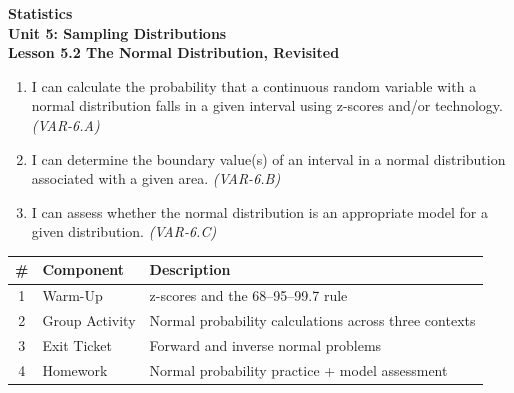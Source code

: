 \documentclass[10pt]{article}
\begin{document}
\vspace{-0.8in}

\begin{center}
  {\color{white}\textbf{\LARGE Statistics}}\\[4pt]
  {\color{skymid}\large\textbf{Unit 5: Sampling Distributions}}\\[6pt]
  {\color{white}\textbf{\large Lesson 5.2 \quad The Normal Distribution, Revisited}}
\end{center}

\vspace{0.22in}
\namedateperiod
\vspace{0.18in}

\begin{learningtargetbox}
\small
\begin{enumerate}[leftmargin=1.5em, itemsep=5pt]
  \item I can calculate the probability that a continuous random variable with a normal
        distribution falls in a given interval using z-scores and/or technology.
        \textit{(VAR-6.A)}
  \item I can determine the boundary value(s) of an interval in a normal distribution
        associated with a given area. \textit{(VAR-6.B)}
  \item I can assess whether the normal distribution is an appropriate model for a
        given distribution. \textit{(VAR-6.C)}
\end{enumerate}
\end{learningtargetbox}

\vspace{0.14in}

\begin{tocbox}
\small
\renewcommand{\arraystretch}{1.5}
\begin{tabularx}{\linewidth}{@{} c l X @{}}
\rowcolor{sky}
\textbf{\#} & \textbf{Component} & \textbf{Description} \\
\midrule
1 & Warm-Up        & z-scores and the 68--95--99.7 rule \\
2 & Group Activity & Normal probability calculations across three contexts \\
3 & Exit Ticket    & Forward and inverse normal problems \\
4 & Homework       & Normal probability practice + model assessment \\
\end{tabularx}
\end{tocbox}
\end{document}
